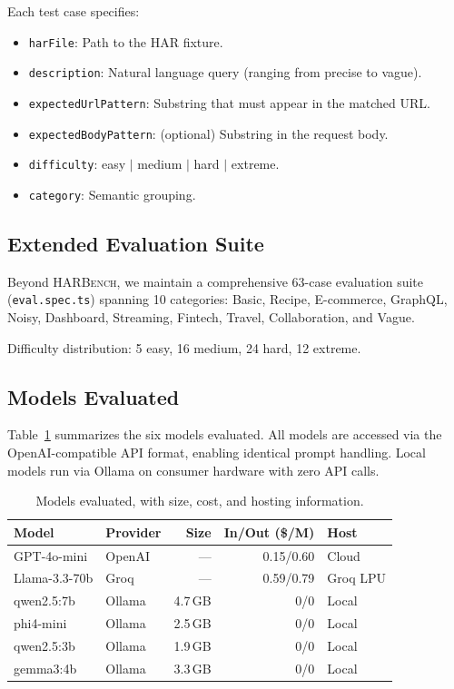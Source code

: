 \documentclass[10pt,twocolumn]{article}
\begin{document}
Each test case specifies:
\begin{itemize}[nosep]
  \item \texttt{harFile}: Path to the HAR fixture.
  \item \texttt{description}: Natural language query (ranging from precise to vague).
  \item \texttt{expectedUrlPattern}: Substring that must appear in the matched URL.
  \item \texttt{expectedBodyPattern}: (optional) Substring in the request body.
  \item \texttt{difficulty}: easy $|$ medium $|$ hard $|$ extreme.
  \item \texttt{category}: Semantic grouping.
\end{itemize}

\subsection{Extended Evaluation Suite}

Beyond \textsc{HARBench}, we maintain a comprehensive 63-case evaluation suite (\texttt{eval.spec.ts}) spanning 10 categories: Basic, Recipe, E-commerce, GraphQL, Noisy, Dashboard, Streaming, Fintech, Travel, Collaboration, and Vague.

Difficulty distribution: 5 easy, 16 medium, 24 hard, 12 extreme.

\subsection{Models Evaluated}

Table~\ref{tab:models} summarizes the six models evaluated. All models are accessed via the OpenAI-compatible API format, enabling identical prompt handling. Local models run via Ollama on consumer hardware with zero API calls.

\begin{table}[t]
\centering
\caption{Models evaluated, with size, cost, and hosting information.}
\label{tab:models}
\scriptsize
\begin{tabularx}{\columnwidth}{@{}l l r r l@{}}
\toprule
\textbf{Model} & \textbf{Provider} & \textbf{Size} & \textbf{In/Out (\$/M)} & \textbf{Host} \\
\midrule
GPT-4o-mini       & OpenAI & ---    & 0.15/0.60 & Cloud  \\
Llama-3.3-70b     & Groq   & ---    & 0.59/0.79 & Groq LPU \\
qwen2.5:7b        & Ollama & 4.7\,GB & 0/0       & Local  \\
phi4-mini          & Ollama & 2.5\,GB & 0/0       & Local  \\
qwen2.5:3b         & Ollama & 1.9\,GB & 0/0       & Local  \\
gemma3:4b          & Ollama & 3.3\,GB & 0/0       & Local  \\
\bottomrule
\end{tabularx}
\end{table}
\end{document}

